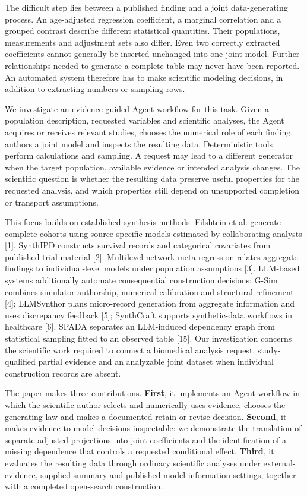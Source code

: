 \documentclass[10pt,twocolumn]{article}
\begin{document}
The difficult step lies between a published finding and a joint data-generating process. An age-adjusted regression coefficient, a marginal correlation and a grouped contrast describe different statistical quantities. Their populations, measurements and adjustment sets also differ. Even two correctly extracted coefficients cannot generally be inserted unchanged into one joint model. Further relationships needed to generate a complete table may never have been reported. An automated system therefore has to make scientific modeling decisions, in addition to extracting numbers or sampling rows.


We investigate an evidence-guided Agent workflow for this task. Given a population description, requested variables and scientific analyses, the Agent acquires or receives relevant studies, chooses the numerical role of each finding, authors a joint model and inspects the resulting data. Deterministic tools perform calculations and sampling. A request may lead to a different generator when the target population, available evidence or intended analysis changes. The scientific question is whether the resulting data preserve useful properties for the requested analysis, and which properties still depend on unsupported completion or transport assumptions.


This focus builds on established synthesis methods. Filshtein et al. generate complete cohorts using source-specific models estimated by collaborating analysts [1]. SynthIPD constructs survival records and categorical covariates from published trial material [2]. Multilevel network meta-regression relates aggregate findings to individual-level models under population assumptions [3]. LLM-based systems additionally automate consequential construction decisions: G-Sim combines simulator authorship, numerical calibration and structural refinement [4]; LLMSynthor plans micro-record generation from aggregate information and uses discrepancy feedback [5]; SynthCraft supports synthetic-data workflows in healthcare [6]. SPADA separates an LLM-induced dependency graph from statistical sampling fitted to an observed table [15]. Our investigation concerns the scientific work required to connect a biomedical analysis request, study-qualified partial evidence and an analyzable joint dataset when individual construction records are absent.


The paper makes three contributions. \textbf{First}, it implements an Agent workflow in which the scientific author selects and numerically uses evidence, chooses the generating law and makes a documented retain-or-revise decision. \textbf{Second}, it makes evidence-to-model decisions inspectable: we demonstrate the translation of separate adjusted projections into joint coefficients and the identification of a missing dependence that controls a requested conditional effect. \textbf{Third}, it evaluates the resulting data through ordinary scientific analyses under external-evidence, supplied-summary and published-model information settings, together with a completed open-search construction.
\end{document}
